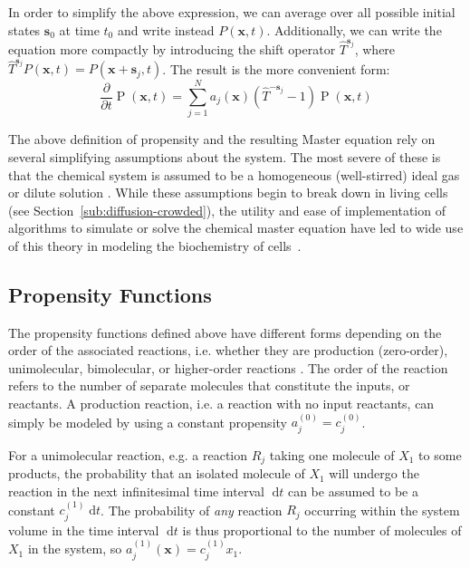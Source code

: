 \documentclass[english,letterpaper,12pt]{report}
\newcommand{\dee}{\;\mathrm{d}}
\renewcommand{\vec}[1]{\ensuremath{\mathbf{#1}}}
\DeclareMathOperator{\Prob}{P}
\begin{document}
\begin{doublespacing}
In order to simplify the above expression, we can average over all possible initial states $\vec{s}_0$ at time $t_0$ and write instead $P(\vec{x}, t)$. Additionally, we can write the equation more compactly by introducing the shift operator $\hat{T}^{\vec{s}_j}$, where $\hat{T}^{\vec{s}_j} P(\vec{x}, t) = P(\vec{x} + \vec{s}_j, t)$. The result is the more convenient form:
\begin{equation}
    \frac{\partial}{\partial t} \Prob(\vec{x}, t) = \sum_{j=1}^N a_j(\vec{x})(\hat{T}^{-\vec{s}_j} - 1)\Prob(\vec{x}, t)
    \label{eq:master-eqn}
\end{equation}

The above definition of propensity and the resulting Master equation rely on several simplifying assumptions about the system. The most severe of these is that the chemical system is assumed to be a homogeneous (well-stirred) ideal gas or dilute solution \cite{langevin-eqn}. While these assumptions begin to break down in living cells (see Section~\ref{sub:diffusion-crowded}), the utility and ease of implementation of algorithms to simulate or solve the chemical master equation have led to wide use of this theory in modeling the biochemistry of cells~\cite{we-chemkin}\cite{stoch-sys-bio}.

\subsection{Propensity Functions} %
\label{sub:propensities}

The propensity functions defined above have different forms depending on the order of the associated reactions, i.e. whether they are production (zero-order), unimolecular, bimolecular, or higher-order reactions \cite{gillespie-ssa}. The order of the reaction refers to the number of separate molecules that constitute the inputs, or reactants. A production reaction, i.e. a reaction with no input reactants, can simply be modeled by using a constant propensity $a_j^{(0)} = c_j^{(0)}$. 

For a unimolecular reaction, e.g. a reaction $R_j$ taking one molecule of $X_1$ to some products, the probability that an isolated molecule of $X_1$ will undergo the reaction in the next infinitesimal time interval $\dee t$ can be assumed to be a constant $c_j^{(1)} \dee t$. The probability of \emph{any} reaction $R_j$ occurring within the system volume in the time interval $\dee t$ is thus proportional to the number of molecules of $X_1$ in the system, so $a_j^{(1)}(\vec{x}) = c_j^{(1)} x_1$.


\end{doublespacing}
\end{document}
